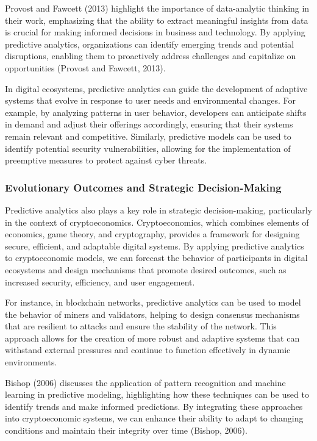 \documentclass[12pt,twoside]{article}
\begin{document}
Provost and Fawcett (2013) highlight the importance of data-analytic thinking in their work, emphasizing that the ability to extract meaningful insights from data is crucial for making informed decisions in business and technology. By applying predictive analytics, organizations can identify emerging trends and potential disruptions, enabling them to proactively address challenges and capitalize on opportunities (Provost and Fawcett, 2013).

In digital ecosystems, predictive analytics can guide the development of adaptive systems that evolve in response to user needs and environmental changes. For example, by analyzing patterns in user behavior, developers can anticipate shifts in demand and adjust their offerings accordingly, ensuring that their systems remain relevant and competitive. Similarly, predictive models can be used to identify potential security vulnerabilities, allowing for the implementation of preemptive measures to protect against cyber threats.


\subsubsection{Evolutionary Outcomes and Strategic Decision-Making}

Predictive analytics also plays a key role in strategic decision-making, particularly in the context of cryptoeconomics. Cryptoeconomics, which combines elements of economics, game theory, and cryptography, provides a framework for designing secure, efficient, and adaptable digital systems. By applying predictive analytics to cryptoeconomic models, we can forecast the behavior of participants in digital ecosystems and design mechanisms that promote desired outcomes, such as increased security, efficiency, and user engagement.

For instance, in blockchain networks, predictive analytics can be used to model the behavior of miners and validators, helping to design consensus mechanisms that are resilient to attacks and ensure the stability of the network. This approach allows for the creation of more robust and adaptive systems that can withstand external pressures and continue to function effectively in dynamic environments.

Bishop (2006) discusses the application of pattern recognition and machine learning in predictive modeling, highlighting how these techniques can be used to identify trends and make informed predictions. By integrating these approaches into cryptoeconomic systems, we can enhance their ability to adapt to changing conditions and maintain their integrity over time (Bishop, 2006).
\end{document}
